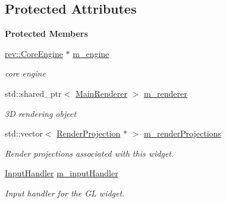 \subsection*{Protected Attributes}
\begin{Indent}\textbf{ Protected Members}\par
\begin{DoxyCompactItemize}
\item 
\mbox{\label{classrev_1_1_view_1_1_g_l_widget_aa102efc6b3b7e05ad2dd499ba79dab06}} 
\mbox{\hyperlink{classrev_1_1_core_engine}{rev\+::\+Core\+Engine}} $\ast$ \mbox{\hyperlink{classrev_1_1_view_1_1_g_l_widget_aa102efc6b3b7e05ad2dd499ba79dab06}{m\+\_\+engine}}
\begin{DoxyCompactList}\small\item\em core engine \end{DoxyCompactList}\item 
\mbox{\label{classrev_1_1_view_1_1_g_l_widget_a7a83059a6eb2b0988ea431e054b5d01a}} 
std\+::shared\+\_\+ptr$<$ \mbox{\hyperlink{classrev_1_1_main_renderer}{Main\+Renderer}} $>$ \mbox{\hyperlink{classrev_1_1_view_1_1_g_l_widget_a7a83059a6eb2b0988ea431e054b5d01a}{m\+\_\+renderer}}
\begin{DoxyCompactList}\small\item\em 3D rendering object \end{DoxyCompactList}\item 
\mbox{\label{classrev_1_1_view_1_1_g_l_widget_a3876bc118b1964bd0e876d60ef657cfe}} 
std\+::vector$<$ \mbox{\hyperlink{classrev_1_1_render_projection}{Render\+Projection}} $\ast$ $>$ \mbox{\hyperlink{classrev_1_1_view_1_1_g_l_widget_a3876bc118b1964bd0e876d60ef657cfe}{m\+\_\+render\+Projections}}
\begin{DoxyCompactList}\small\item\em Render projections associated with this widget. \end{DoxyCompactList}\item 
\mbox{\label{classrev_1_1_view_1_1_g_l_widget_a8f6ad6d45885a5f2d248bc4589cf2b2f}} 
\mbox{\hyperlink{classrev_1_1_input_handler}{Input\+Handler}} \mbox{\hyperlink{classrev_1_1_view_1_1_g_l_widget_a8f6ad6d45885a5f2d248bc4589cf2b2f}{m\+\_\+input\+Handler}}
\begin{DoxyCompactList}\small\item\em Input handler for the GL widget. \end{DoxyCompactList}\end{DoxyCompactItemize}
\end{Indent}
